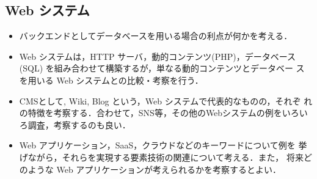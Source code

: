 \subsection*{Web システム}
\begin{itemize}
 \item バックエンドとしてデータベースを用いる場合の利点が何かを考える．
 \item Web システムは，HTTP サーバ，動的コンテンツ(PHP)，データベース
       (SQL) を組み合わせて構築するが，単なる動的コンテンツとデータベー
       スを用いる Web システムとの比較・考察を行う．
 \item CMSとして, Wiki, Blog という，Web システムで代表的なものの，それぞ
       れの特徴を考察する．合わせて，SNS等，その他のWebシステムの例をいろいろ調査，考察するのも良い．
 \item Web アプリケーション，SaaS，クラウドなどのキーワードについて例を
       挙げながら，それらを実現する要素技術の関連について考える．また，
       将来どのような Web アプリケーションが考えられるかを考察するとよい．
\end{itemize}

\clearpage

